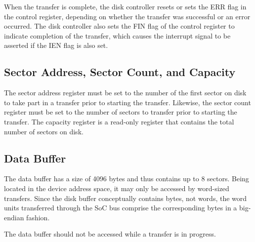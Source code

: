 When the transfer is complete, the disk controller resets or sets the ERR flag in the control register, depending on whether the transfer was successful or an error occurred. The disk controller also sets the FIN flag of the control register to indicate completion of the transfer, which causes the interrupt signal to be asserted if the IEN flag is also set.

\subsection{Sector Address, Sector Count, and Capacity}

The sector address register must be set to the number of the first sector on disk to take part in a transfer prior to starting the transfer. Likewise, the sector count register must be set to the number of sectors to transfer prior to starting the transfer. The capacity register is a read-only register that contains the total number of sectors on disk.

\subsection{Data Buffer}

The data buffer has a size of 4096 bytes and thus contains up to 8 sectors. Being located in the device address space, it may only be accessed by word-sized transfers. Since the disk buffer conceptually contains bytes, not words, the word units transferred through the SoC bus comprise the corresponding bytes in a big-endian fashion.

The data buffer should not be accessed while a transfer is in progress.
